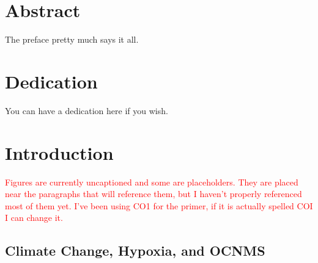\documentclass[12pt,twoside]{reedthesis}
\begin{document}
    \tableofcontents
    \listoftables
    \listoffigures

    \chapter*{Abstract}
	The preface pretty much says it all.
	
	\chapter*{Dedication}
	You can have a dedication here if you wish.

  \mainmatter %
  \pagestyle{fancyplain} %


    \chapter*{Introduction}


\textcolor{red}{Figures are currently uncaptioned and some are placeholders. They are placed near the paragraphs that will reference them, but I haven't properly referenced most of them yet. I've been using CO1 for the primer, if it is actually spelled COI I can change it.}
	

\section{Climate Change, Hypoxia, and OCNMS}
\end{document}
